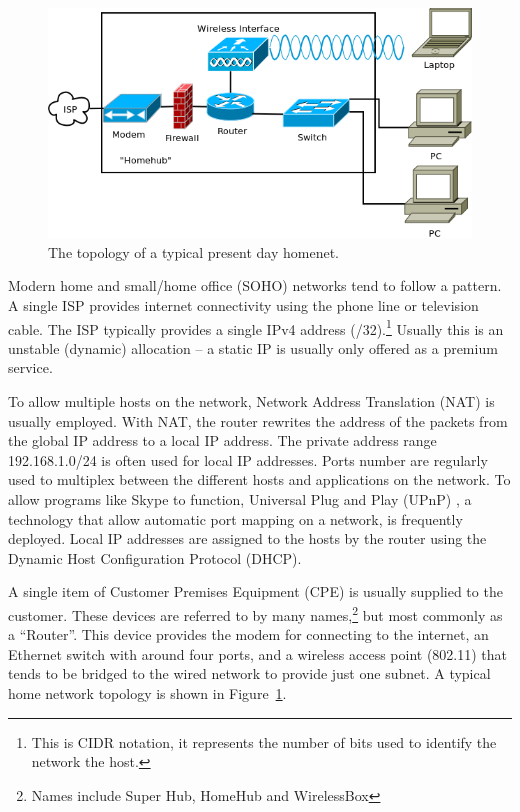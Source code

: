 \begin{figure}
\begin{center}
  \includegraphics[width=\linewidth]{../Diagrams/Network/TypicalHomenet.png}
	\caption{The topology of a typical present day homenet.}\label{fig:typical_homenet}
\end{center}
\end{figure}

Modern home and small/home office (SOHO)  networks tend to follow a pattern. A single ISP provides internet
connectivity using the phone line or television cable.  The ISP typically
provides a single IPv4 address (/32).\footnote{This is CIDR notation, it
represents the number of bits used to identify the network the host.} Usually
this is an unstable (dynamic) allocation -- a static IP is usually only offered
as a premium service. 

To allow multiple hosts on the network, Network Address Translation (NAT)
 is usually employed. With NAT,
the router rewrites the address of the packets from the global IP address to a
local IP address. The private address range 192.168.1.0/24 is often used for
local IP addresses. Ports number are regularly used to multiplex between the
different hosts and applications on the network. To allow programs like Skype
to function, Universal Plug and Play (UPnP) , a technology that allow automatic port mapping on a network, is
frequently deployed. Local IP addresses are assigned to the hosts by the router
using the Dynamic Host Configuration Protocol (DHCP). 

A single item of Customer Premises Equipment (CPE)  is usually supplied to the customer. These devices are
referred to by many names,\footnote{Names include Super Hub, HomeHub and
WirelessBox} but most commonly as a ``Router''.  This device provides the modem for
connecting to the internet, an Ethernet switch with around four ports, and a
wireless access point (802.11) that tends to be bridged to the wired network to
provide just one subnet. A typical home network topology is shown in
Figure~\ref{fig:typical_homenet}.

